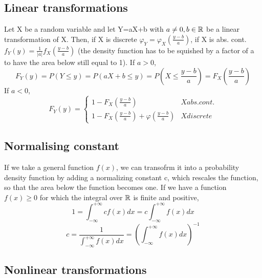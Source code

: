\subsection{Linear transformations}
\begin{proposition}
    Let X be a random variable and let Y=aX+b with $a\ne0, b \in \mathbb{R}$ be a linear transformation of X. Then, if X is discrete $\varphi_Y=\varphi_X(\frac{y-b}{a})$, if X is abs. cont. $f_Y(y)=\frac{1}{\left\lvert a \right\rvert}f_X(\frac{y-b}{a})$ (the density function has to be squished by a factor of a to have the area below still equal to 1).
    If $a>0$,
    \begin{equation*}
        F_Y(y)=P(Y \le y)=P(aX+b \le y)=P(X \le \frac{y-b}{a})=F_X(\frac{y-b}{a})
    \end{equation*}
    If $a<0$,
    \begin{equation*}
        F_Y(y)=\begin{cases*}
            1-F_X(\frac{y-b}{a}) & X abs. cont. \\
            1-F_X(\frac{y-b}{a})+\varphi(\frac{y-b}{a}) & X discrete
        \end{cases*}
    \end{equation*}
\end{proposition}
\subsection{Normalising constant}
If we take a general function $f(x)$, we can transofrm it into a probability density function by adding a normalizing constant c, which rescales the function, so that the area below the function becomes one.
If we have a function $ f(x)\ge0 $ for which the integral over $\mathbb{R}$ is finite and positive,
\begin{equation*}
    1=\int_{-\infty}^{+\infty}{cf(x)dx}=c\int_{-\infty}^{+\infty}{f(x)dx}
\end{equation*}
\begin{equation*}
    c = \frac{1}{\int_{-\infty}^{+\infty}{f(x)dx}}=(\int_{-\infty}^{+\infty}{f(x)dx})^{-1}
\end{equation*}
\subsection{Nonlinear transformations}